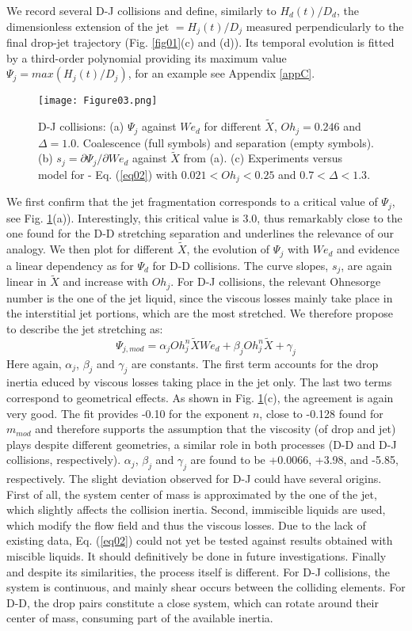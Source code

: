 \documentclass{article}
\begin{document}
 We record several D-J collisions and define, similarly to  $H_d(t)/D_d$, the  dimensionless extension of the jet $=H_j(t)/D_j$  measured perpendicularly to the final drop-jet trajectory (Fig. \ref{fig01}(c) and (d)). Its temporal evolution is fitted by a third-order polynomial providing its maximum value $\Psi_j=max(H_j(t)/D_j)$, for an example see Appendix \ref{appC}.
\begin{figure}
\texttt{[image: Figure03.png]}
\caption{\label{fig03} D-J collisions: (a) $\Psi_j$ against  $We_d$ for different $\tilde{X}$,  {$Oh_j=0.246$ and $\Delta=1.0$}. Coalescence (full symbols) and separation (empty symbols). (b) $s_j=\partial \Psi_j/ \partial We_d$  against $\tilde{X}$ {from (a)}. (c) Experiments versus model for - Eq. (\ref{eq02}) with $0.021<Oh_j<0.25$ and  $0.7<\Delta <1.3$.}
\end{figure}

We first confirm that the jet fragmentation  corresponds to a critical value of $\Psi_j$, see Fig. \ref{fig03}(a)). Interestingly, this critical value is {3.0, thus remarkably close to the one found for the D-D stretching separation} and underlines the relevance of our analogy.  We then plot for different $\tilde{X}$, the evolution of $\Psi_j$ with $We_{d}$ and evidence a linear dependency as for $\Psi_d$ for D-D collisions.  The curve slopes, $s_j$,  are again linear in $\tilde{X}$ and increase with {$Oh_j$}.  For D-J collisions,  the relevant {Ohnesorge number} is the one of the jet liquid, since {the viscous losses mainly take place in the interstitial jet portions, which are the most stretched}.
 We therefore propose to describe the jet stretching as: 
 \begin{equation}
\Psi_{j, mod} = \alpha_{j} Oh_j^n \tilde{X} We_{d} + \beta_j Oh_j^n \tilde{X} + \gamma_j
\tag{3} \label{eq02}
 \end{equation}
Here again, $\alpha_j$,  $\beta_j$ and $\gamma_j$ are constants. The first term accounts for  the drop inertia educed by viscous losses taking place in the jet only. The  last two terms correspond to geometrical effects.
As shown in Fig. \ref{fig03}(c), the agreement is again very good. The fit provides  -0.10 for the exponent $n$, close to -0.128 found for $m_{mod}$ and therefore supports the assumption that the viscosity (of drop and jet) plays despite different geometries, a similar role in both processes (D-D and D-J collisions, respectively). $\alpha_j$, $\beta_j$ and $\gamma_j$ are found to be +0.0066, +3.98, and -5.85, respectively. The slight deviation observed for D-J could have several origins. First of all, the system center of mass is approximated by the one of the jet, which slightly affects the collision inertia. Second, immiscible liquids are used, which modify the {flow field and thus the viscous losses. Due to the lack of existing data, Eq. (\ref{eq02}) could not yet be tested against results obtained with miscible liquids. It should definitively be done in future investigations.} Finally and despite its similarities, the process itself is  different. For D-J collisions, the system is continuous, and mainly shear occurs between the colliding elements. For D-D, the drop pairs constitute a close system, which can rotate around their center of mass, consuming part of the available inertia.
 
\end{document}
